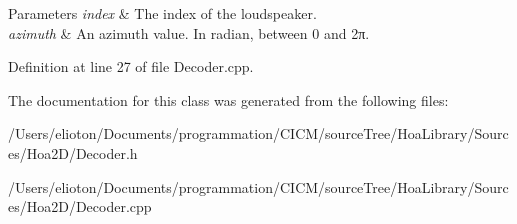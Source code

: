 \begin{DoxyParams}{Parameters}
{\em index} & The index of the loudspeaker. \\
\hline
{\em azimuth} & An azimuth value. In radian, between 0 and 2π. \\
\hline
\end{DoxyParams}


Definition at line 27 of file Decoder.\-cpp.



The documentation for this class was generated from the following files\-:\begin{DoxyCompactItemize}
\item 
/\-Users/elioton/\-Documents/programmation/\-C\-I\-C\-M/source\-Tree/\-Hoa\-Library/\-Sources/\-Hoa2\-D/Decoder.\-h\item 
/\-Users/elioton/\-Documents/programmation/\-C\-I\-C\-M/source\-Tree/\-Hoa\-Library/\-Sources/\-Hoa2\-D/Decoder.\-cpp\end{DoxyCompactItemize}
